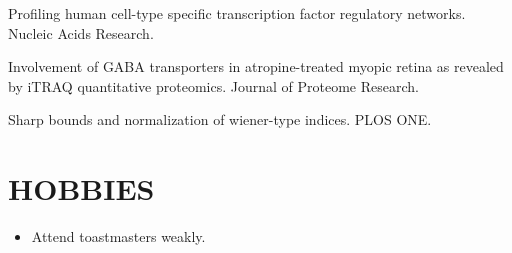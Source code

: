 \documentclass[paper=letter,fontsize=11pt]{scrartcl} %
\newcommand{\sepspace}{\vspace*{1em}}		%
\newcommand{\NewPart}[2]{\section*{\uppercase{#1} #2}}
\newcommand{\PaperEntry}[7]{
		\noindent #2. #3.}
\newcommand{\PosterEntry}[3]{
    \noindent #1, #2, #3}
\newcommand{\ReferenceEntry}[3]{
        \noindent \textbf{#1} \par 
        \noindent #2 \par
        \noindent \underline{\textit{Contact Information}} \par
        \noindent #3 \par }
\begin{document}
\begin{etaremune}
\item \PaperEntry{Zhang S$^\star$, \textbf{Tian D}$^\star$,  Tran N.H, Choi K.P, and Zhang L.X}{Profiling human cell-type specific transcription factor regulatory networks}{Nucleic Acids Research}{42}{20}{2014}{https://academic.oup.com/nar/article/42/20/12380/2902979}  
\item \PaperEntry{Barathi V.A, Chaurasia S.S, Poidinger M, Koh S.K, \textbf{Tian D}, Ho C, Iuvone P.M, Beuerman R.W, Zhou L}{Involvement of GABA transporters in atropine-treated myopic retina as revealed by iTRAQ quantitative proteomics}{Journal of Proteome Research}{13}{11}{2014}{https://pubs.acs.org/doi/abs/10.1021/pr500558y}
\item \PaperEntry{\textbf{Tian D} and Choi K.P}{Sharp bounds and normalization of wiener-type indices}{PLOS ONE}{8}{11}{2013}{https://journals.plos.org/plosone/article?id=10.1371/journal.pone.0078448}
\end{etaremune}


\NewPart{Hobbies}{}
\begin{itemize}
    \item Attend toastmasters weakly.
\end{itemize}


\end{document}
